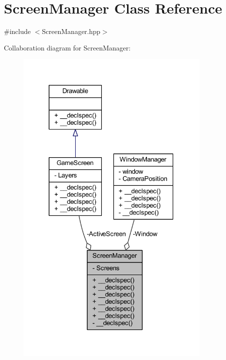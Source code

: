 \hypertarget{class_screen_manager}{\section{Screen\-Manager Class Reference}
\label{class_screen_manager}
}


{\ttfamily \#include $<$Screen\-Manager.\-hpp$>$}



Collaboration diagram for Screen\-Manager\-:\nopagebreak
\begin{figure}[H]
\begin{center}
\leavevmode
\includegraphics[width=272pt]{class_screen_manager__coll__graph}
\end{center}
\end{figure}
